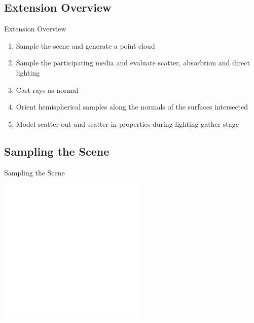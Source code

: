 \documentclass[compress,professionalfont]{beamer}
\begin{document}
\subsection{Extension Overview}
\begin{frame}{Extension Overview}

    \begin{enumerate}
        \item Sample the scene and generate a point cloud
        \item Sample the participating media and evaluate scatter, absorbtion and direct lighting
        \item Cast rays as normal
        \item Orient hemispherical samples along the normals of the surfaces intersected
        \item Model scatter-out and scatter-in properties during lighting gather stage
    \end{enumerate}

\end{frame}




\subsection{Sampling the Scene}
\begin{frame}{Sampling the Scene}

    \centering
    \includegraphics[height=70mm]{../img/diag/surfel_samp.pdf}

\end{frame}
\end{document}
